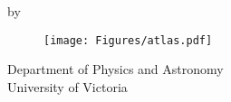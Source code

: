 \pagebreak

\vspace{20mm}

{
\centering
\thesistitle
\tpbreak
by
\tpbreak
\nameanddegrees
\tpbreak
}

\vspace{30mm}

\begin{figure}[h]
\centering
\texttt{[image: Figures/atlas.pdf]}
\end{figure}

{
\centering
\tpbreak
Department of Physics and Astronomy\\
University of Victoria
\tpbreak
}

\vfill
\pagebreak
